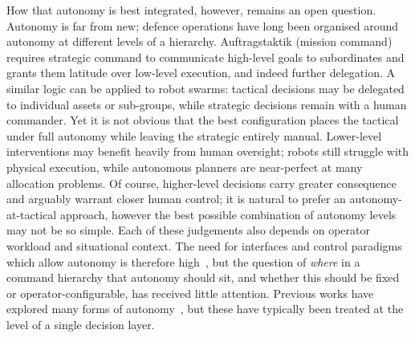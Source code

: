 \documentclass[10pt]{article}
\theoremstyle{definition}
\begin{document}
How that autonomy is best integrated, however, remains an open question. Autonomy is far from new; defence operations have long been organised around autonomy at different levels of a hierarchy. Auftragstaktik (mission command) requires strategic command to communicate high-level goals to subordinates and grants them latitude over low-level execution, and indeed further delegation. A similar logic can be applied to robot swarms: tactical decisions may be delegated to individual assets or sub-groups, while strategic decisions remain with a human commander. Yet it is not obvious that the best configuration places the tactical under full autonomy while leaving the strategic entirely manual. Lower-level interventions may benefit heavily from human oversight; robots still struggle with physical execution, while  autonomous planners are near-perfect at many allocation problems. Of course, higher-level decisions carry greater consequence and arguably warrant closer human control; it is natural to prefer an autonomy-at-tactical approach, however the best possible combination of autonomy levels may not be so simple. Each of these judgements also depends on operator workload and situational context. The need for interfaces and control paradigms which allow autonomy is therefore high~\cite{mod2022ukairpower}, but the question of \textit{where} in a command hierarchy that autonomy should sit, and whether this should be fixed or operator-configurable, has received little attention. Previous works have explored many forms of autonomy~\cite{nam_trust_2018}, but these have typically been treated at the level of a single decision layer.


\end{document}
